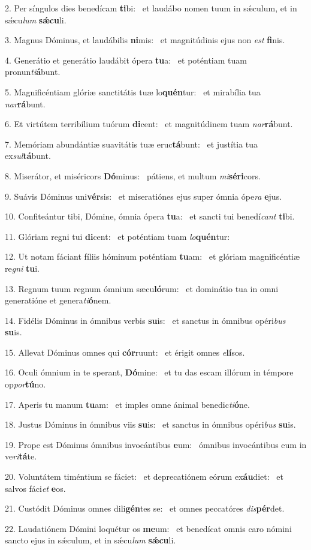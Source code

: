 2. Per síngulos dies benedícam \textbf{ti}bi: \ast\  et laudábo nomen tuum in sǽculum, et in sǽcu\textit{lum} \textbf{sǽ}\textbf{cu}li.\

3. Magnus Dóminus, et laudábilis \textbf{ni}mis: \ast\  et magnitúdinis ejus non \textit{est} \textbf{fi}nis.\

4. Generátio et generátio laudábit ópera \textbf{tu}a: \ast\  et poténtiam tuam pronun\textit{ti}\textbf{á}bunt.\

5. Magnificéntiam glóriæ sanctitátis tuæ lo\textbf{quén}tur: \ast\  et mirabília tua \textit{nar}\textbf{rá}bunt.\

6. Et virtútem terribílium tuórum \textbf{di}cent: \ast\  et magnitúdinem tuam \textit{nar}\textbf{rá}bunt.\

7. Memóriam abundántiæ suavitátis tuæ eruc\textbf{tá}bunt: \ast\  et justítia tua ex\textit{sul}\textbf{tá}bunt.\

8. Miserátor, et miséricors \textbf{Dó}minus: \ast\  pátiens, et multum \textit{mi}\textbf{sé}\textbf{ri}cors.\

9. Suávis Dóminus uni\textbf{vér}sis: \ast\  et miseratiónes ejus super ómnia ópe\textit{ra} \textbf{e}jus.\

10. Confiteántur tibi, Dómine, ómnia ópera \textbf{tu}a: \ast\  et sancti tui benedí\textit{cant} \textbf{ti}bi.\

11. Glóriam regni tui \textbf{di}cent: \ast\  et poténtiam tuam \textit{lo}\textbf{quén}tur:\

12. Ut notam fáciant fíliis hóminum poténtiam \textbf{tu}am: \ast\  et glóriam magnificéntiæ re\textit{gni} \textbf{tu}i.\

13. Regnum tuum regnum ómnium sæcu\textbf{ló}rum: \ast\  et dominátio tua in omni generatióne et genera\textit{ti}\textbf{ó}nem.\

14. Fidélis Dóminus in ómnibus verbis \textbf{su}is: \ast\  et sanctus in ómnibus opéri\textit{bus} \textbf{su}is.\

15. Allevat Dóminus omnes qui \textbf{cór}ruunt: \ast\  et érigit omnes \textit{e}\textbf{lí}sos.\

16. Oculi ómnium in te sperant, \textbf{Dó}mine: \ast\  et tu das escam illórum in témpore op\textit{por}\textbf{tú}no.\

17. Aperis tu manum \textbf{tu}am: \ast\  et imples omne ánimal benedic\textit{ti}\textbf{ó}ne.\

18. Justus Dóminus in ómnibus viis \textbf{su}is: \ast\  et sanctus in ómnibus opéri\textit{bus} \textbf{su}is.\

19. Prope est Dóminus ómnibus invocántibus \textbf{e}um: \ast\  ómnibus invocántibus eum in ve\textit{ri}\textbf{tá}te.\

20. Voluntátem timéntium se fáciet: \dag\  et deprecatiónem eórum ex\textbf{áu}diet: \ast\  et salvos fáci\textit{et} \textbf{e}os.\

21. Custódit Dóminus omnes dili\textbf{gén}tes se: \ast\  et omnes peccatóres \textit{dis}\textbf{pér}det.\

22. Laudatiónem Dómini loquétur os \textbf{me}um: \ast\  et benedícat omnis caro nómini sancto ejus in sǽculum, et in sǽcu\textit{lum} \textbf{sǽ}\textbf{cu}li.\

